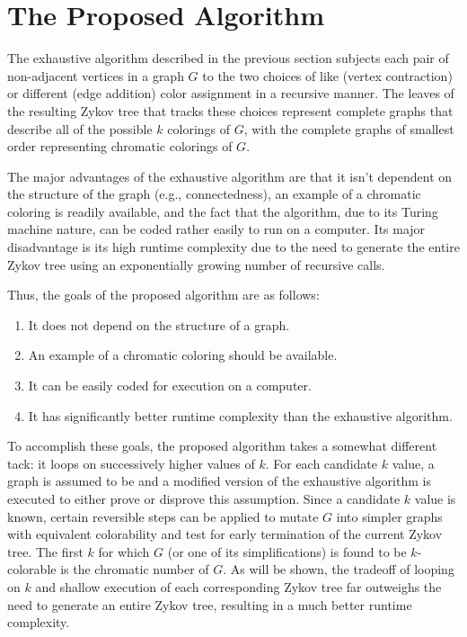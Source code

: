 \section{The Proposed Algorithm}

The exhaustive algorithm described in the previous section subjects each pair of non-adjacent vertices in a graph
\(G\) to the two choices of like (vertex contraction) or different (edge addition) color assignment in a recursive
manner.  The leaves of the resulting Zykov tree that tracks these choices represent complete graphs that describe
all of the possible \(k\) colorings of \(G\), with the complete graphs of smallest order representing chromatic
colorings of \(G\).

The major advantages of the exhaustive algorithm are that it isn't dependent on the structure of the graph (e.g.,
connectedness), an example of a chromatic coloring is readily available, and the fact that the algorithm, due to
its Turing machine nature, can be coded rather easily to run on a computer.  Its major disadvantage is its high
runtime complexity due to the need to generate the entire Zykov tree using an exponentially growing number of
recursive calls.

Thus, the goals of the proposed algorithm are as follows:
\begin{enumerate}
\item It does not depend on the structure of a graph.
\item An example of a chromatic coloring should be available.
\item It can be easily coded for execution on a computer.
\item It has significantly better runtime complexity than the exhaustive algorithm.
\end{enumerate}

To accomplish these goals, the proposed algorithm takes a somewhat different tack: it loops on successively higher
values of \(k\).  For each candidate \(k\) value, a graph is assumed to be  and a modified version of
the exhaustive algorithm is executed to either prove or disprove this assumption.  Since a candidate \(k\) value is
known, certain reversible steps can be applied to mutate \(G\) into simpler graphs with equivalent colorability and
test for early termination of the current Zykov tree.  The first \(k\) for which \(G\) (or one of its
simplifications) is found to be \(k\)-colorable is the chromatic number of \(G\).  As will be shown, the tradeoff
of looping on \(k\) and shallow execution of each corresponding Zykov tree far outweighs the need to generate an
entire Zykov tree, resulting in a much better runtime complexity.

